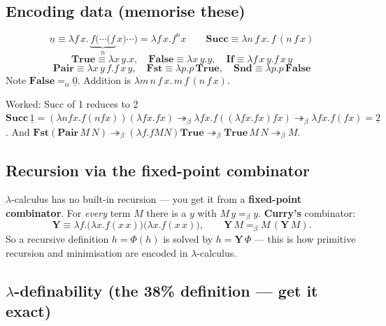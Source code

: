 \documentclass[11pt,a4paper]{article}
\newcommand{\cn}[1]{\underline{#1}}     %
\newcommand{\lam}{\lambda}
\newcommand{\breds}{\twoheadrightarrow_\beta}
\newcommand{\beq}{=_\beta}
\begin{document}
\subsection{Encoding data (memorise these)}

\begin{must}[title=Church numerals and basic combinators]
\[
\cn n \equiv \lam f\,x.\,\underbrace{f(\cdots(f}_{n}\,x)\cdots)=\lam f\,x.f^n x
\qquad
\mathbf{Succ}\equiv\lam n\,f\,x.\,f\,(n\,f\,x)
\]
\[
\mathbf{True}\equiv\lam x\,y.x,\quad \mathbf{False}\equiv\lam x\,y.y,\quad \mathbf{If}\equiv\lam f\,x\,y.f\,x\,y
\]
\[
\mathbf{Pair}\equiv\lam x\,y\,f.f\,x\,y,\quad \mathbf{Fst}\equiv\lam p.p\,\mathbf{True},\quad \mathbf{Snd}\equiv\lam p.p\,\mathbf{False}
\]
Note $\mathbf{False}=_\alpha\cn0$. Addition is $\lam m\,n\,f\,x.\,m\,f\,(n\,f\,x)$.
\end{must}

\begin{plain}{Worked: Succ of 1 reduces to 2}
$\mathbf{Succ}\,\cn1 = (\lam n f x.f(nfx))(\lam fx.fx)\breds \lam fx.f((\lam fx.fx)fx)\breds\lam fx.f(fx)=\cn2$. \quad
And $\mathbf{Fst}(\mathbf{Pair}\,M\,N)\breds(\lam f.fMN)\mathbf{True}\breds\mathbf{True}\,M\,N\breds M$.
\end{plain}

\subsection{Recursion via the fixed-point combinator}

\begin{must}
$\lambda$-calculus has no built-in recursion --- you get it from a \textbf{fixed-point combinator}. For \emph{every} term $M$ there is a $y$ with $M\,y\beq y$. \textbf{Curry's} combinator:
\[
\mathbf Y \equiv \lam f.\big(\lam x.f(x\,x)\big)\big(\lam x.f(x\,x)\big),
\qquad
\mathbf Y\,M \beq M\,(\mathbf Y\,M).
\]
So a recursive definition $h=\Phi(h)$ is solved by $h=\mathbf Y\,\Phi$ --- this is how primitive recursion and minimisation are encoded in $\lambda$-calculus.
\end{must}

\subsection{$\lambda$-definability (the 38\% definition --- get it exact)}
\end{document}
